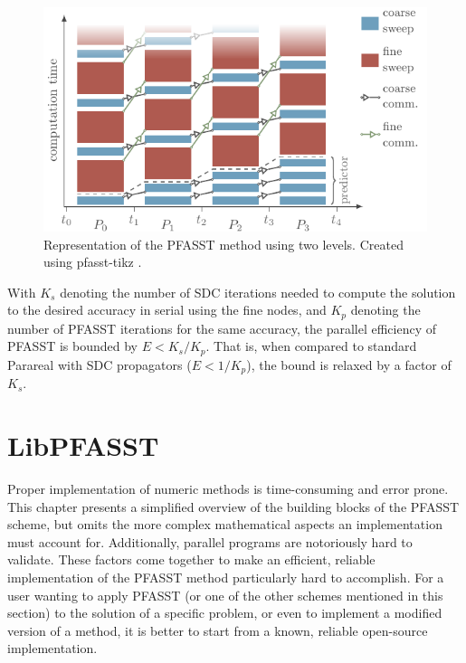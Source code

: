 \begin{figure}[ht]
  \centering{}
  \includegraphics[width=\textwidth]{images/pfasst_diagram.pdf}
  \caption{Representation of the PFASST method using two levels. Created using pfasst-tikz \protect\footnotemark.}
\end{figure}

With \(K_s\) denoting the number of SDC iterations needed to compute the solution to the desired accuracy in serial using the fine nodes, and \(K_p\) denoting the number of PFASST iterations for the same accuracy, the parallel efficiency of PFASST is bounded by \(E < K_s/K_p\). That is, when compared to standard Parareal with SDC propagators (\(E < 1/K_p\)), the bound is relaxed by a factor of \(K_s\).

\section{LibPFASST} \label{sec:libpfasst_usage}

Proper implementation of numeric methods is time-consuming and error prone. This chapter presents a simplified overview of the building blocks of the PFASST scheme, but omits the more complex mathematical aspects an implementation must account for. Additionally, parallel programs are notoriously hard to validate. These factors come together to make an efficient, reliable implementation of the PFASST method particularly hard to accomplish. For a user wanting to apply PFASST (or one of the other schemes mentioned in this section) to the solution of a specific problem, or even to implement a modified version of a method, it is better to start from a known, reliable open-source implementation.

